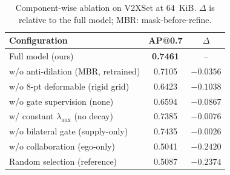 \begin{table}[t]
\centering
\small
\caption{Component-wise ablation on V2XSet at 64~KiB. $\Delta$ is relative to the full model; MBR: mask-before-refine.}
\label{tab:components}
\begin{tabular}{lcc}
\toprule
Configuration & AP@0.7 & $\Delta$ \\
\midrule
Full model (ours)                       & \textbf{0.7461} & -- \\
w/o anti-dilation (MBR, retrained)     & 0.7105 & $-0.0356$ \\
w/o 8-pt deformable (rigid grid)        & 0.6423 & $-0.1038$ \\
w/o gate supervision (none)             & 0.6594 & $-0.0867$ \\
w/ constant $\lambda_{\mathrm{aux}}$ (no decay)        & 0.7385 & $-0.0076$ \\
w/o bilateral gate (supply-only)        & 0.7435 & $-0.0026$ \\
w/o collaboration (ego-only)            & 0.5041 & $-0.2420$ \\
\midrule
Random selection (reference)            & 0.5087 & $-0.2374$ \\
\bottomrule
\end{tabular}
\end{table}
